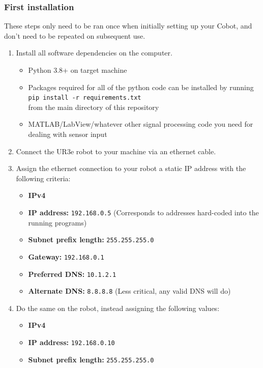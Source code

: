 \documentclass[11pt]{article}
\begin{document}
\subsubsection{First installation}
These steps only need to be ran once when initially setting up your Cobot, and don't need to be repeated on subsequent use.
\begin{enumerate}
    \item Install all software dependencies on the computer.
    \begin{itemize}
        \item Python 3.8+ on target machine
        \item Packages required for all of the python code can be installed by running \\ \texttt{pip install -r requirements.txt} \\ from the main directory of this repository
        \item MATLAB/LabView/whatever other signal processing code you need for dealing with sensor input
    \end{itemize}
    \item Connect the UR3e robot to your machine via an ethernet cable.
    \item Assign the ethernet connection to your robot a static IP address with the following criteria:
    \begin{itemize}
        \item \textbf{IPv4}
        \item \textbf{IP address:} \texttt{192.168.0.5} (Corresponds to addresses hard-coded into the running programs)
        \item \textbf{Subnet prefix length:} \texttt{255.255.255.0}
        \item \textbf{Gateway:} \texttt{192.168.0.1}
        \item \textbf{Preferred DNS:}  \texttt{10.1.2.1}
        \item \textbf{Alternate DNS:} \texttt{8.8.8.8} (Less critical, any valid DNS will do)
    \end{itemize}
    \item Do the same on the robot, instead assigning the following values:
    \begin{itemize}
        \item \textbf{IPv4}
        \item \textbf{IP address:} \texttt{192.168.0.10}
        \item \textbf{Subnet prefix length:} \texttt{255.255.255.0}

\end{itemize}
\end{enumerate}
\end{document}
